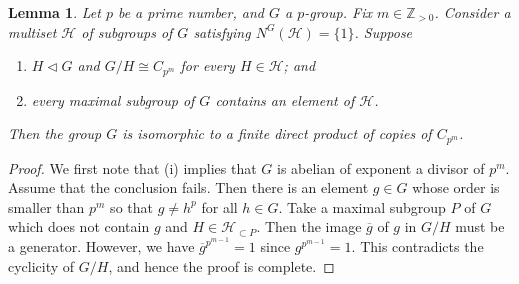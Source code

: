 \documentclass[12pt]{amsart}
\theoremstyle{plain}
\newtheorem{lem}[thm]{Lemma}
\theoremstyle{definition}
\numberwithin{thm}{section}
\numberwithin{equation}{section}
\newcommand{\Zpn}{\mathbb{Z}_{>0}}
\newcommand{\cH}{\mathcal{H}}
\DeclareMathOperator{\red}{red}
\DeclareMathOperator{\nor}{nor}
\begin{document}

\begin{lem}\label{lem:cyst}
Let $p$ be a prime number, and $G$ a $p$-group. Fix $m\in \Zpn$. Consider a multiset $\cH$ of subgroups of $G$ satisfying $N^{G}(\cH)=\{1\}$. Suppose 
\begin{enumerate}
    \item $H\triangleleft G$ and $G/H\cong C_{p^{m}}$ for every $H\in \cH$; and
    \item every maximal subgroup of $G$ contains an element of $\cH$. 
\end{enumerate}
Then the group $G$ is isomorphic to a finite direct product of copies of $C_{p^{m}}$. 
\end{lem}

\begin{proof}
We first note that (i) implies that $G$ is abelian of exponent a divisor of $p^{m}$. Assume that the conclusion fails. Then there is an element $g\in G$ whose order is smaller than $p^{m}$ so that $g\neq h^{p}$ for all $h\in G$. Take a maximal subgroup $P$ of $G$ which does not contain $g$ and $H\in \cH_{\subset P}$. Then the image $\overline{g}$ of $g$ in $G/H$ must be a generator. However, we have $\overline{g}^{p^{m-1}}=1$ since $g^{p^{m-1}}=1$. This contradicts the cyclicity of $G/H$, and hence the proof is complete. 
\end{proof}
\end{document}
